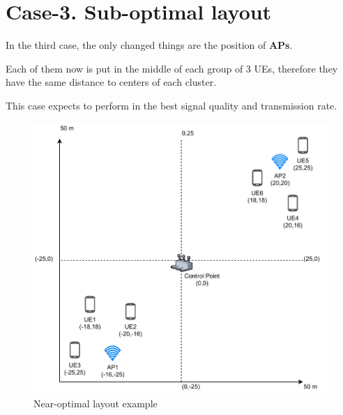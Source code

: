 \section{Case-3. Sub-optimal layout}\label{case-3.-near-optimal-layout}

In the third case, the only changed things are the position of
\textbf{APs}.

Each of them now is put in the middle of each group of 3 UEs, therefore
they have the same distance to centers of each cluster.

This case expects to perform in the best signal quality and transmission rate.

\begin{figure}[H]
	\centering
	\includegraphics[width=\linewidth,keepaspectratio]{images/05-cases-description-Sub-optimal.pdf}
\caption{Near-optimal layout example}
\end{figure}
